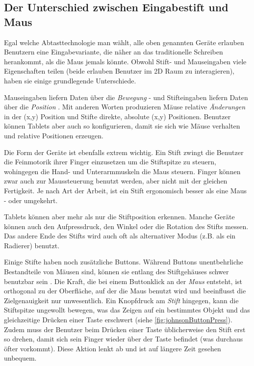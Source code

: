 \subsection{Der Unterschied zwischen Eingabestift und Maus}

Egal welche Abtasttechnologie man wählt, alle oben genannten Geräte erlauben Benutzern eine Eingabevariante, die näher an das traditionelle Schreiben herankommt, als die Maus jemals könnte. Obwohl Stift- und Mauseingaben viele Eigenschaften teilen (beide erlauben Benutzer im 2D Raum zu interagieren), haben sie einige grundlegende Unterschiede.

\medskip Mauseingaben liefern Daten über die \emph{Bewegung} - und Stifteingaben liefern Daten über die \emph{Position} \citep{Hinckley:2002}. Mit anderen Worten produzieren Mäuse relative \emph{Änderungen} in der (x,y) Position und Stifte direkte, absolute (x,y) Positionen. Benutzer können Tablets aber auch so konfigurieren, damit sie sich wie Mäuse verhalten und relative Positionen erzeugen.

\medskip Die Form der Geräte ist ebenfalls extrem wichtig. Ein Stift zwingt die Benutzer die Feinmotorik ihrer Finger einzusetzen um die Stiftspitze zu steuern, wohingegen die Hand- und Unterarmmuskeln die Maus steuern. Finger können zwar auch zur Maussteuerung benutzt werden, aber nicht mit der gleichen Fertigkeit. Je nach Art der Arbeit, ist ein Stift ergonomisch besser als eine Maus - oder umgekehrt.

Tablets können aber mehr als nur die Stiftposition erkennen. Manche Geräte können auch den Aufpressdruck, den Winkel oder die Rotation des Stifts messen. Das andere Ende des Stifts wird auch oft als alternativer Modus (z.B. als ein Radierer) benutzt. 

Einige Stifte haben noch zusätzliche Buttons. Während Buttons unentbehrliche Bestandteile von Mäusen sind, können sie entlang des Stiftgehäuses schwer benutzbar sein \citep{Plimmer:2008}. Die Kraft, die bei einem Buttonklick an der \emph{Maus} entsteht, ist orthogonal zu der Oberfläche, auf der die Maus benutzt wird und beeinflusst die Zielgenauigkeit nur unwesentlich. Ein Knopfdruck am \emph{Stift} hingegen, kann die Stiftspitze ungewollt bewegen, was das Zeigen auf ein bestimmtes Objekt und das gleichzeitige Drücken einer Taste erschwert (siehe \autoref{fig:johnsonButtonPress}). Zudem muss der Benutzer beim Drücken einer Taste üblicherweise den Stift erst so drehen, damit sich sein Finger wieder über der Taste befindet (was durchaus öfter vorkommt). Diese Aktion lenkt ab und ist auf längere Zeit gesehen unbequem. \citep{Johnson:2009}

